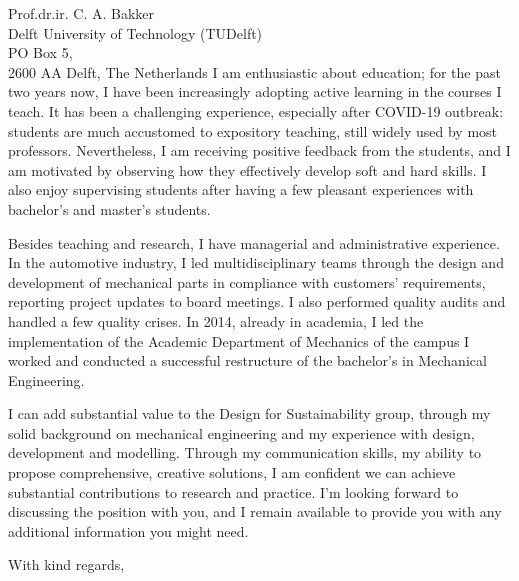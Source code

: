 \documentclass[sender,
    paper=a4,
    version=last,
    fontsize=12pt,
    DIV=12,
    BCOR=0mm]{scrlttr2}
\begin{document}
\begin{letter}{
    Prof.dr.ir. C. A. Bakker \\
    Delft University of Technology (TUDelft)\\
    PO Box 5, \\
    2600 AA Delft, The Netherlands
}
I am enthusiastic about education; for the past two years now, I have been increasingly adopting active learning in the courses I teach. It has been a challenging experience, especially after COVID-19 outbreak: students are much accustomed to expository teaching, still widely used by most professors. Nevertheless, I am receiving positive feedback from the students, and I am motivated by observing how they effectively develop soft and hard skills. I also enjoy supervising students after having a few pleasant experiences with bachelor's and master's students.

Besides teaching and research, I have managerial and administrative experience. In the automotive industry, I led multidisciplinary teams through the design and development of mechanical parts in compliance with customers' requirements, reporting project updates to board meetings. I also performed quality audits and handled a few quality crises. In 2014, already in academia, I led the implementation of the Academic Department of Mechanics of the campus I worked and conducted a successful restructure of the bachelor's in Mechanical Engineering.

I can add substantial value to the Design for Sustainability group, through my solid background on mechanical engineering and my experience with design, development and modelling. Through my communication skills, my ability to propose comprehensive, creative solutions, I am confident we can achieve substantial contributions to research and practice. I'm looking forward to discussing the position with you, and I remain available to provide you with any additional information you might need.

\closing{With kind regards,} %
\vfill
{} 
\end{letter}
\end{document}
